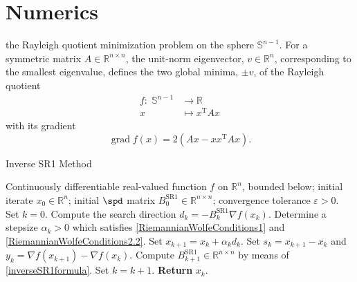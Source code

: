 \chapter{Numerics}

the Rayleigh quotient minimization problem on the sphere $\mathbb{S}^{n-1}$. For a symmetric matrix $A \in \mathbb{R}^{n \times n}$, the unit-norm eigenvector, $v \in \mathbb{R}^n$, corresponding to the smallest eigenvalue, defines the two global minima, $\pm v$, of the Rayleigh quotient  
\begin{equation}\label{RayleighQuotient}
    \begin{split}
        f \colon \; \mathbb{S}^{n-1} & \to \mathbb{R} \\
        x & \mapsto x^{\mathrm{T}} A x 
    \end{split}
\end{equation}   
with its gradient 
\begin{equation*}
    \operatorname{grad} f(x) = 2(Ax - x x^{\mathrm{T}} A x).
\end{equation*}

\begin{algorithm}[H]
    \caption{Inverse SR1 Method}\label{RiemannianSR1Method}
    \begin{algorithmic}[1]
        \State Continuously differentiable real-valued function $f$ on $\mathbb{R}^n$, bounded below; initial iterate $x_0 \in \mathbb{R}^n$; initial $\spd$ matrix $B^{\mathrm{SR1}}_0 \in \mathbb{R}^{n \times n}$; convergence tolerance $\varepsilon > 0$. Set $k = 0$.
            \State Compute the search direction $d_k = - B^{\mathrm{SR1}}_k \nabla f(x_k)$.
            \State Determine a stepsize $\alpha_k > 0$ which satisfies \cref{RiemannianWolfeConditions1} and \cref{RiemannianWolfeConditions2.2}.
            \State Set $x_{k+1} = x_k + \alpha_k d_k$.
            \State Set $s_k = x_{k+1} - x_k$ and $y_k = \nabla f(x_{k+1}) - \nabla f(x_k)$.
            \State Compute $B^{\mathrm{SR1}}_{k+1} \in \mathbb{R}^{n \times n}$ by means of \cref{inverseSR1formula}. 
            \State Set $k = k+1$.
        \EndWhile
        \State \textbf{Return} $x_k$.
    \end{algorithmic}
\end{algorithm}

